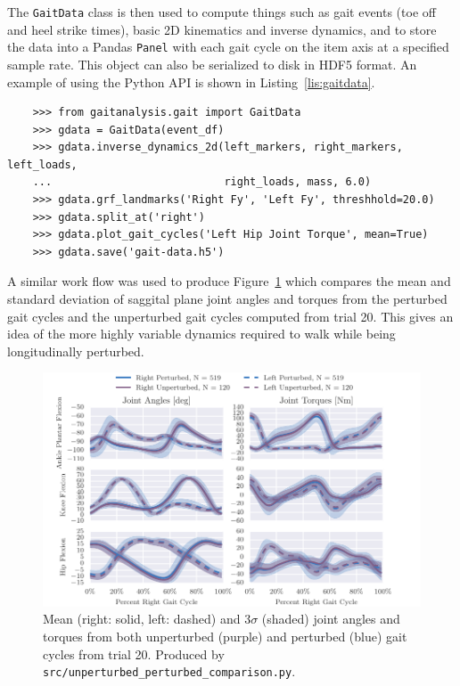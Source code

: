 \documentclass[fleqn,10pt]{wlpeerj}
\begin{document}
The \verb|GaitData| class is then used to compute things such as gait events
(toe off and heel strike times), basic 2D kinematics and inverse dynamics, and
to store the data into a Pandas \verb|Panel| with each gait cycle on the item
axis at a specified sample rate. This object can also be serialized to disk in
HDF5 format. An example of using the Python API is shown in
Listing~\ref{lis:gaitdata}.
%
\begin{listing}
  \begin{verbatim}
    >>> from gaitanalysis.gait import GaitData
    >>> gdata = GaitData(event_df)
    >>> gdata.inverse_dynamics_2d(left_markers, right_markers, left_loads,
    ...                           right_loads, mass, 6.0)
    >>> gdata.grf_landmarks('Right Fy', 'Left Fy', threshhold=20.0)
    >>> gdata.split_at('right')
    >>> gdata.plot_gait_cycles('Left Hip Joint Torque', mean=True)
    >>> gdata.save('gait-data.h5')
  \end{verbatim}
  \cprotect\caption{Python interpreter session showing how one could use the
    \verb|GaitData| class to load in the result of \verb|DFlowData| and compute
    the inverse dynamics (joint angles and torques), identify the gait event
    (e.g. heel strikes), split the data with respect to the gait events in a
    Pandas \verb|Panel|, plot the mean and standard deviation of one time
    history with respect to the gait cycles, and save the data to disk.}
  \label{lis:gaitdata}
\end{listing}

A similar work flow was used to produce Figure~\ref{fig:angle-torque-comparison}
which compares the mean and standard deviation of saggital plane joint angles
and torques from the perturbed gait cycles and the unperturbed gait cycles
computed from trial 20. This gives an idea of the more highly variable dynamics
required to walk while being longitudinally perturbed.
%
\begin{figure}
  \centering
  \includegraphics{figures/unperturbed-perturbed-comparison.pdf}
  \cprotect\caption{Mean (right: solid, left: dashed) and $3\sigma$ (shaded)
    joint angles and torques from both unperturbed (purple) and perturbed
    (blue) gait cycles from trial 20. Produced by
    \verb|src/unperturbed_perturbed_comparison.py|.}
  \label{fig:angle-torque-comparison}
\end{figure}
\end{document}
